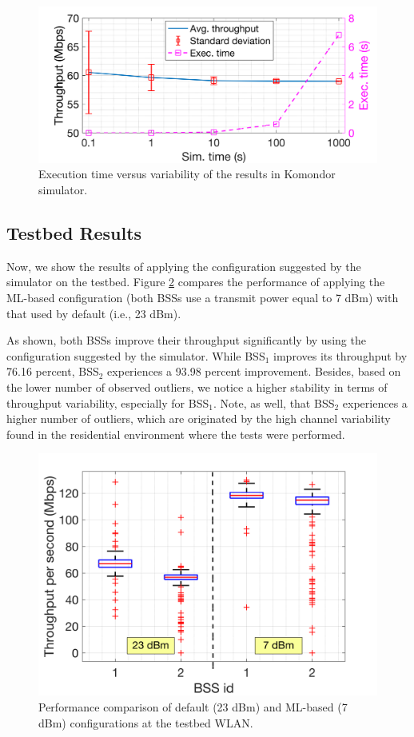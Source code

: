 \documentclass[journal]{IEEEtran}
\begin{document}
	\begin{figure}[ht!]
		\centering
		\includegraphics[width=0.9\columnwidth]{test_sim_time_vs_accuracy.png}
		\caption{Execution time versus variability of the results in Komondor simulator.}
		\label{fig:test_sim_time_vs_accuracy}
	\end{figure}
	
	\subsection{Testbed Results}
	Now, we show the results of applying the configuration suggested by the simulator on the testbed. Figure \ref{fig:results} compares the performance of applying the ML-based configuration (both BSSs use a transmit power equal to 7 dBm) with that used by default (i.e., 23 dBm).
	
	As shown, both BSSs improve their throughput significantly by using the configuration suggested by the simulator. While BSS$_1$ improves its throughput by 76.16 percent, BSS$_2$ experiences a 93.98 percent improvement. Besides, based on the lower number of observed outliers, we notice a higher stability in terms of throughput variability, especially for BSS$_1$. Note, as well, that BSS$_2$ experiences a higher number of outliers, which are originated by the high channel variability found in the residential environment where the tests were performed.
	\begin{figure}[ht!!!!]
		\centering
		\includegraphics[width=0.8\columnwidth]{boxplotbps.png}
		\caption{Performance comparison of default (23 dBm) and ML-based (7 dBm) configurations at the testbed WLAN.}
		\label{fig:results}
	\end{figure}
	
\end{document}

